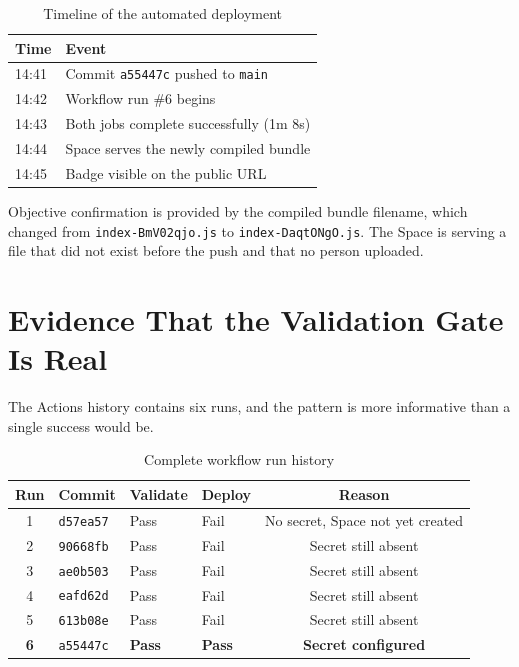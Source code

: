\documentclass[11pt,a4paper]{report}
\begin{document}
\begin{table}[H]
\centering
\caption{Timeline of the automated deployment}
\begin{tabular}{@{}ll@{}}
\toprule
\textbf{Time} & \textbf{Event} \\
\midrule
14:41 & Commit \texttt{a55447c} pushed to \texttt{main} \\
14:42 & Workflow run \#6 begins \\
14:43 & Both jobs complete successfully (1m 8s) \\
14:44 & Space serves the newly compiled bundle \\
14:45 & Badge visible on the public URL \\
\bottomrule
\end{tabular}
\end{table}

Objective confirmation is provided by the compiled bundle filename, which changed
from \texttt{index-BmV02qjo.js} to \texttt{index-DaqtONgO.js}. The Space is
serving a file that did not exist before the push and that no person uploaded.

\section{Evidence That the Validation Gate Is Real}

The Actions history contains six runs, and the pattern is more informative than
a single success would be.

\begin{table}[H]
\centering
\caption{Complete workflow run history}
\begin{tabular}{@{}clllc@{}}
\toprule
\textbf{Run} & \textbf{Commit} & \textbf{Validate} & \textbf{Deploy} &
\textbf{Reason} \\
\midrule
1 & \texttt{d57ea57} & Pass & Fail & No secret, Space not yet created \\
2 & \texttt{90668fb} & Pass & Fail & Secret still absent \\
3 & \texttt{ae0b503} & Pass & Fail & Secret still absent \\
4 & \texttt{eafd62d} & Pass & Fail & Secret still absent \\
5 & \texttt{613b08e} & Pass & Fail & Secret still absent \\
\textbf{6} & \texttt{a55447c} & \textbf{Pass} & \textbf{Pass} &
\textbf{Secret configured} \\
\bottomrule
\end{tabular}
\end{table}
\end{document}
